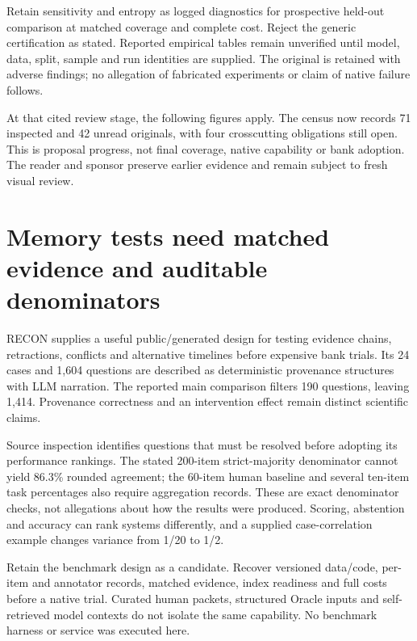 Retain sensitivity and entropy as logged diagnostics for prospective
held-out comparison at matched coverage and complete cost. Reject the
generic certification as stated. Reported empirical tables remain
unverified until model, data, split, sample and run identities are
supplied. The original is retained with adverse findings; no allegation
of fabricated experiments or claim of native failure follows.
\citep{exec23_sua_original}

At that cited review stage, the following figures apply. The census now
records 71 inspected and 42 unread originals, with four crosscutting
obligations still open. This is proposal progress, not final coverage,
native capability or bank adoption. The reader and sponsor preserve
earlier evidence and remain subject to fresh visual review.
\citep{sp23sua_reader,sp23sua_progress}

\hypertarget{memory-tests-need-matched-evidence-and-auditable-denominators}{%
\section{Memory tests need matched evidence and auditable
denominators}\label{memory-tests-need-matched-evidence-and-auditable-denominators}}

RECON supplies a useful public/generated design for testing evidence
chains, retractions, conflicts and alternative timelines before
expensive bank trials. Its 24 cases and 1,604 questions are described as
deterministic provenance structures with LLM narration. The reported
main comparison filters 190 questions, leaving 1,414. Provenance
correctness and an intervention effect remain distinct scientific
claims. \citep{exec23_recon_original}

Source inspection identifies questions that must be resolved before
adopting its performance rankings. The stated 200-item strict-majority
denominator cannot yield 86.3\% rounded agreement; the 60-item human
baseline and several ten-item task percentages also require aggregation
records. These are exact denominator checks, not allegations about how
the results were produced. Scoring, abstention and accuracy can rank
systems differently, and a supplied case-correlation example changes
variance from 1/20 to 1/2. \citep{exec23_recon_reference}

Retain the benchmark design as a candidate. Recover versioned data/code,
per-item and annotator records, matched evidence, index readiness and
full costs before a native trial. Curated human packets, structured
Oracle inputs and self-retrieved model contexts do not isolate the same
capability. No benchmark harness or service was executed here.
\citep{exec23_recon_original}


